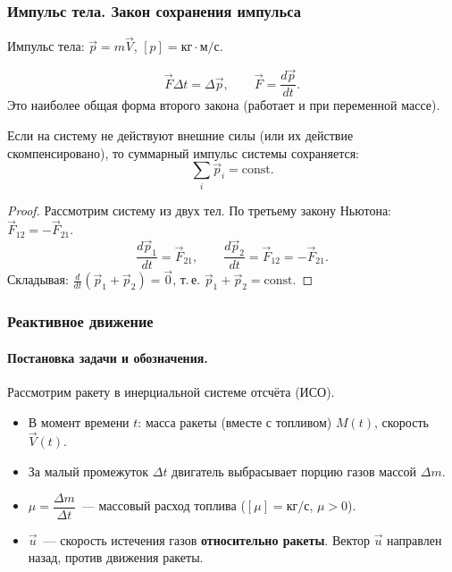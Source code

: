 \documentclass[12pt]{article}
\begin{document}
\subsubsection{Импульс тела. Закон сохранения импульса}

\begin{definition}
	Импульс тела: $\vec{p} = m\vec{V}$, $[p] = \text{кг}\cdot\text{м/с}$.
\end{definition}

\begin{definition}
	\[
		\vec{F} \Delta t = \Delta \vec{p}, \qquad \vec{F} = \frac{d\vec{p}}{dt}.
	\]
	Это наиболее общая форма второго закона (работает и при переменной массе).
\end{definition}

\begin{law}
	Если на систему не действуют внешние силы (или их действие скомпенсировано), то суммарный импульс системы сохраняется:
	\[
		\sum_i \vec{p}_i = \mathrm{const}.
	\]
\end{law}

\begin{proof}
	Рассмотрим систему из двух тел. По третьему закону Ньютона: $\vec{F}_{12} = -\vec{F}_{21}$.
	\[
		\frac{d\vec{p}_1}{dt} = \vec{F}_{21}, \qquad \frac{d\vec{p}_2}{dt} = \vec{F}_{12} = -\vec{F}_{21}.
	\]
	Складывая: $\frac{d}{dt}(\vec{p}_1 + \vec{p}_2) = \vec{0}$, т.\,е. $\vec{p}_1 + \vec{p}_2 = \mathrm{const}$.
\end{proof}

\subsubsection{Реактивное движение}

\paragraph{Постановка задачи и обозначения.}
Рассмотрим ракету в инерциальной системе отсчёта (ИСО).
\begin{itemize}
	\item В момент времени $t$: масса ракеты (вместе с топливом) $M(t)$, скорость $\vec{V}(t)$.
	\item За малый промежуток $\Delta t$ двигатель выбрасывает порцию газов массой $\Delta m$.
	\item $\mu = \dfrac{\Delta m}{\Delta t}$~--- массовый расход топлива ($[\mu] = \text{кг/с}$, $\mu > 0$).
	\item $\vec{u}$~--- скорость истечения газов \textbf{относительно ракеты}. Вектор $\vec{u}$ направлен назад, против движения ракеты.
\end{itemize}
\end{document}
